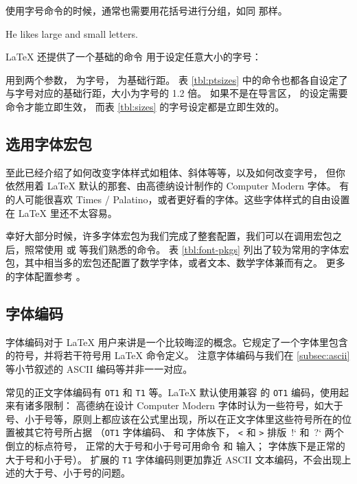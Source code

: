 使用字号命令的时候，通常也需要用花括号进行分组，如同  那样。
\begin{example}
He likes {\LARGE large and
{\small small} letters}.
\end{example}

\LaTeX{} 还提供了一个基础的命令  用于设定任意大小的字号：
\begin{command}
\end{command}

 用到两个参数， 为字号， 为基础行距。
表 \ref{tbl:ptsizes} 中的命令也都各自设定了与字号对应的基础行距，大小为字号的 1.2 倍。
如果不是在导言区， 的设定需要  命令才能立即生效，
而表 \ref{tbl:sizes} 的字号设定都是立即生效的。

\subsection{选用字体宏包}\label{subsec:font-pkgs}

至此已经介绍了如何改变字体样式如粗体、斜体等等，以及如何改变字号，
但你依然用着 \LaTeX{} 默认的那套、由高德纳设计制作的 Computer Modern 字体。
有的人可能很喜欢 Times / Palatino，或者更好看的字体。这些字体样式的自由设置在 \LaTeX{} 里还不太容易。

幸好大部分时候，许多字体宏包为我们完成了整套配置，我们可以在调用宏包之后，照常使用  或  等我们熟悉的命令。
表 \ref{tbl:font-pkgs} 列出了较为常用的字体宏包，其中相当多的宏包还配置了数学字体，或者文本、数学字体兼而有之。
更多的字体配置参考 \cite{survey,fontcatalogue}。

\subsection{字体编码}\label{subsec:font-encs}

字体编码对于 \LaTeX{} 用户来讲是一个比较晦涩的概念。它规定了一个字体里包含的符号，并将若干符号用 \LaTeX{} 命令定义。
注意字体编码与我们在 \ref{subsec:ascii} 等小节叙述的 ASCII 编码等并非一一对应。

常见的正文字体编码有 \texttt{OT1} 和 \texttt{T1} 等。\LaTeX{} 默认使用兼容  的 \texttt{OT1} 编码，使用起来有诸多限制：
高德纳在设计 Computer Modern 字体时认为一些符号，如大于号、小于号等，原则上都应该在公式里出现，所以在正文字体里这些符号所在的位置被其它符号所占据
（\texttt{OT1} 字体编码、 和  字体族下， \texttt< 和 \texttt> 排版\ !` 和\ ?` 两个倒立的标点符号，
正常的大于号和小于号可用命令  和  输入； 字体族下是正常的大于号和小于号）。
扩展的 \texttt{T1} 字体编码则更加靠近 ASCII 文本编码，不会出现上述的大于号、小于号的问题。

